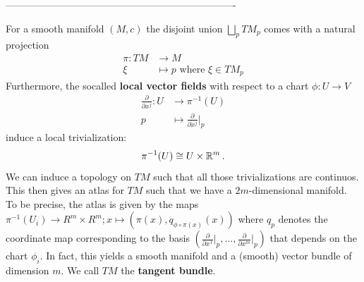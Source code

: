 ----------------------------------------------------------------------















\begin{definition}
    For a smooth manifold $(M,c)$ the disjoint union $\bigsqcup_pTM_p$ comes with a natural projection 
    \begin{align*}
        \pi: TM &\to M \\
        \xi &\mapsto p \text{ where }\xi \in TM_p 
    \end{align*} Furthermore, the socalled \textbf{local vector fields} with respect to a chart $\phi:U\to V$
    \begin{align*}
        \frac{\partial}{\partial x^j}: U & \to \pi^{-1}(U) \\
        p &\mapsto \frac{\partial}{\partial x^j}\Big|_p
    \end{align*} induce a local trivialization:
    \begin{align*}
        \pi^{-1}(U)\cong U \times \mathbb{R}^m\, .
    \end{align*} We can induce a topology on $TM$ such that all those trivializations are continuos. This then gives an atlas for $TM$ such that we have a $2m$-dimensional manifold. To be precise, the atlas is given by the maps $\pi^{-1}(U_i)\to R^m\times R^m; x\mapsto (\pi(x),q_{\phi\circ \pi(x)}(x))$ where $q_p$ denotes the coordinate map corresponding to the basis $(\frac{\partial}{\partial x^1}\big|_p,...,\frac{\partial}{\partial x^m}\big|_p)$ that depends on the chart $\phi_i$.  In fact, this yields a smooth manifold and a (smooth) vector bundle of dimension $m$. We call $TM$ the \textbf{tangent bundle}.
\end{definition}


